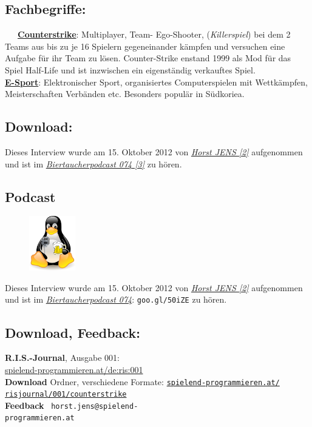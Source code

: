 \subsection*{Fachbegriffe:}

~~~\href{http://de.wikipedia.org/wiki/Counter-Strike}{\textbf{Counterstrike}}: Multiplayer, Team- Ego-Shooter, (\textit{Killerspiel}) bei dem 2 Teams aus bis zu je 16 Spielern gegeneinander kämpfen und versuchen eine Aufgabe für ihr Team zu lösen. Counter-Strike enstand 1999 als Mod für das Spiel Half-Life und ist inzwischen ein eigenständig verkauftes Spiel.  \\

\href{http://de.wikipedia.org/wiki/E-Sport}{\textbf{E-Sport}}: Elektronischer Sport, organisiertes Computerspielen mit Wettkämpfen, Meisterschaften Verbänden etc. Besonders populär in Südkoriea. \\

\subsection*{Download:}
Dieses Interview  wurde am 15. Oktober 2012 von \href{http://spielend-programmieren.at}{\textit{Horst JENS [2]}} aufgenommen und ist im \href{http://spielend-programmieren.at/de:podcast:biertaucher:2012:074}{\textit{Biertaucherpodcast 074 [3]}} zu hören.  

\subsection*{Podcast}
\begin{figure}
\includegraphics[width=2cm]{nomad/biertaucherlogo.png}
\end{figure}
Dieses Interview  wurde am 15. Oktober 2012 von \href{http://spielend-programmieren.at}{\textit{Horst JENS [2]}} aufgenommen und ist im \href{http://spielend-programmieren.at/de:podcast:biertaucher:2012:074}{\textit{Biertaucherpodcast 074}}: \texttt{goo.gl/50iZE} zu hören.

\subsection*{Download, Feedback:}
\textbf{R.I.S.-Journal}, Ausgabe 001: \\
\href{http://spielend-programmieren.at/de:ris:001}{spielend-programmieren.at/de:ris:001}\\
\textbf{Download} Ordner, verschiedene Formate: \href{http://spielend-programmieren.at/risjournal/001/counterstrike}{\texttt{spielend-programmieren.at/\\risjournal/001/counterstrike}} \\
\textbf{Feedback} \Letter\ \texttt{horst.jens@spielend-\\programmieren.at} \\


